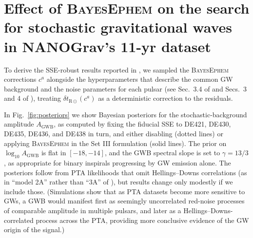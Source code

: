 \documentclass[iop,apj,twocolappendix]{emulateapj}
\begin{document}
\section{Effect of \textsc{BayesEphem} on the search for stochastic gravitational waves in NANOGrav's 11-yr dataset}
\label{sec:results}

To derive the SSE-robust results reported in \cite{2018ApJ...859...47A}, we sampled the \textsc{BayesEphem} corrections $c^a$ alongside the hyperparameters that describe the common GW background and the noise parameters for each pulsar (see Sec.\ 3.4 of \citealt{2018ApJ...859...47A} and Secs.\ 3 and 4 of \citealt{2016ApJ...821...13A}), treating $\delta t_{\mathrm{R}\odot}(c^a)$ as a deterministic correction to the residuals.

In Fig.\ \ref{fig:posteriors} we show Bayesian posteriors for the stochastic-background amplitude $A_\mathrm{GWB}$, as computed by fixing the fiducial SSE to DE421, DE430, DE435, DE436, and DE438 in turn, and either disabling (dotted lines) or applying \textsc{BayesEphem} in the Set III formulation (solid lines). The prior on $\log_{10} A_\mathrm{GWB}$ is flat in $[-18,-14]$, and the GWB spectral slope is set to $\gamma = 13/3$, as appropriate for binary inspirals progressing by GW emission alone. The posteriors follow from PTA likelihoods that omit Hellings--Downs correlations (as in ``model 2A'' rather than ``3A'' of \citealt{2018ApJ...859...47A}), but results change only modestly if we include those.
(Simulations show that as PTA datasets become more sensitive to GWs, a GWB would manifest first as seemingly uncorrelated red-noise processes of comparable amplitude in multiple pulsars, and later as a Hellings--Downs-correlated process across the PTA, providing more conclusive evidence of the GW origin of the signal.)
\end{document}
